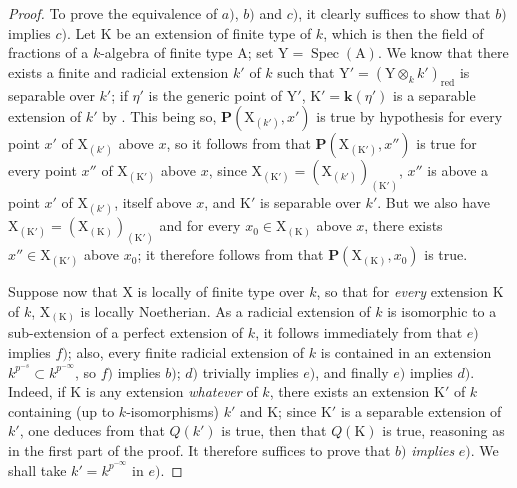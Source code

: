 \begin{proof}
To prove the equivalence of $a)$, $b)$ and $c)$, it clearly suffices to show that $b)$ implies $c)$. Let $\mathrm{K}$ be an extension of finite type of $k$, which is then the field of fractions of a $k$-algebra of finite type $\mathrm{A}$; set $\mathrm{Y}=\operatorname{Spec}(\mathrm{A})$. We know  that there exists a finite and radicial extension $k'$ of $k$ such that $\mathrm{Y}'=(\mathrm{Y}\otimes_k k')_{\mathrm{red}}$ is separable over $k'$; if $\eta'$ is the generic point of $\mathrm{Y}'$, $\mathrm{K}'=\boldsymbol{k}(\eta')$ is a separable extension of $k'$ by . This being so, $\boldsymbol{P}(\mathrm{X}_{(k')},x')$ is true by hypothesis for every point $x'$ of $\mathrm{X}_{(k')}$ above $x$, so it follows from  that $\boldsymbol{P}(\mathrm{X}_{(\mathrm{K}')},x'')$ is true for every point $x''$ of $\mathrm{X}_{(\mathrm{K}')}$ above $x$, since $\mathrm{X}_{(\mathrm{K}')}=(\mathrm{X}_{(k')})_{(\mathrm{K}')}$, $x''$ is above a point $x'$ of $\mathrm{X}_{(k')}$, itself above $x$, and $\mathrm{K}'$ is separable over $k'$. But we also have $\mathrm{X}_{(\mathrm{K}')}=(\mathrm{X}_{(\mathrm{K})})_{(\mathrm{K}')}$ and for every $x_0\in\mathrm{X}_{(\mathrm{K})}$ above $x$, there exists $x''\in\mathrm{X}_{(\mathrm{K}')}$ above $x_0$; it therefore follows from  that $\boldsymbol{P}(\mathrm{X}_{(\mathrm{K})},x_0)$ is true.

Suppose now that $\mathrm{X}$ is locally of finite type over $k$, so that for \emph{every} extension $\mathrm{K}$ of $k$, $\mathrm{X}_{(\mathrm{K})}$ is locally Noetherian. As a radicial extension of $k$ is isomorphic to a sub-extension of a perfect extension of $k$, it follows immediately from  that $e)$ implies $f)$; also, every finite radicial extension of $k$ is contained in an extension $k^{p^{-s}}\subset k^{p^{-\infty}}$, so $f)$ implies $b)$; $d)$ trivially implies $e)$, and finally $e)$ implies $d)$. Indeed, if $\mathrm{K}$ is any extension \emph{whatever} of $k$, there exists an extension $\mathrm{K}'$ of $k$ containing (up to $k$-isomorphisms) $k'$ and $\mathrm{K}$; since $\mathrm{K}'$ is a separable extension of $k'$, one deduces from  that $Q(k')$ is true, then that $Q(\mathrm{K})$ is true, reasoning as in the first part of the proof. It therefore suffices to prove that $b)$ \emph{implies} $e)$. We shall take $k'=k^{p^{-\infty}}$ in $e)$.


\end{proof}
